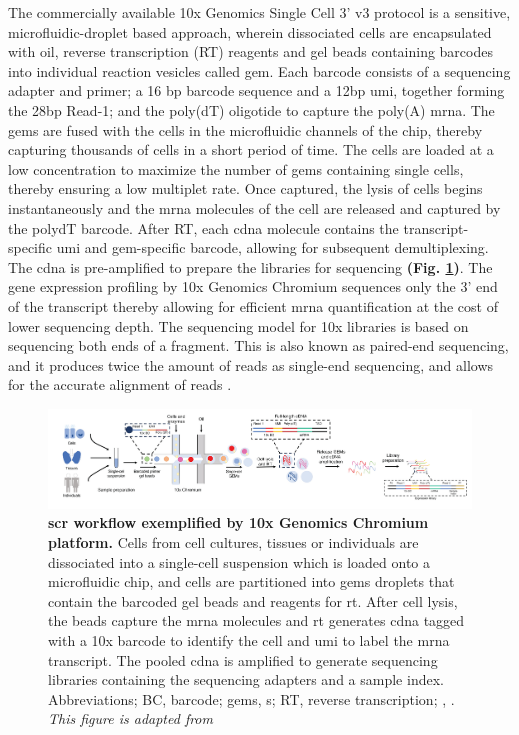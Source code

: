 \par The commercially available 10x Genomics Single Cell 3’ v3 protocol is a sensitive, microfluidic-droplet based approach, wherein dissociated cells are encapsulated with oil, reverse transcription (RT) reagents and gel beads containing barcodes into individual reaction vesicles called \gls{gem}. Each barcode consists of a sequencing adapter and primer; a 16 \gls{bp}  barcode sequence and a 12\gls{bp} \gls{umi}, together forming the 28\gls{bp} Read-1; and the poly(dT) oligotide to capture the poly(A) \gls{mrna}. The \gls{gem}s are fused with the cells in the microfluidic channels of the chip, thereby capturing thousands of cells in a short period of time. The cells are loaded at a low concentration to maximize the number of \gls{gem}s containing single cells, thereby ensuring a low multiplet rate. Once captured, the lysis of cells begins instantaneously and the \gls{mrna} molecules of the cell are released and captured by the polydT barcode. After RT, each \gls{cdna} molecule contains the transcript-specific \gls{umi} and \gls{gem}-specific barcode, allowing for subsequent demultiplexing. The \gls{cdna} is pre-amplified to prepare the libraries for sequencing \textbf{(Fig. \ref{fig:chp1_10xgenomics})}. The gene expression profiling by 10x Genomics Chromium sequences only the 3’ end of the transcript thereby allowing for efficient \gls{mrna} quantification at the cost of lower sequencing depth. The sequencing model for 10x libraries is based on sequencing both ends of a fragment. This is also known as paired-end sequencing, and it produces twice the amount of reads as single-end sequencing, and allows for the accurate alignment of reads \textbf{\cite{danielski_guidance_2023, noauthor_paired-end_nodate}}.\\

\begin{figure}[t]
    \centering
    \includegraphics[width=\linewidth]{Chapter1/Fig/F1-5-03.png}
    \caption[ with 10x Genomics Chromium platform]{\textbf{\gls{scr} workflow exemplified by 10x Genomics Chromium platform.} Cells from cell cultures, tissues or individuals are dissociated into a single-cell suspension which is loaded onto a microfluidic chip, and cells are partitioned into \glspl{gem} droplets that contain the barcoded gel beads and reagents for \gls{rt}. After cell lysis, the beads capture the \gls{mrna} molecules and \gls{rt} generates \gls{cdna} tagged with a 10x barcode to identify the cell and \gls{umi} to label the \gls{mrna} transcript. The pooled \gls{cdna} is amplified to generate sequencing libraries containing the sequencing adapters and a sample index. Abbreviations; BC, barcode; \glspl{gem}, s; RT, reverse transcription; , . \textit{This figure is adapted from \textbf{\cite{swaminath_use_2024}}}}
    \label{fig:chp1_10xgenomics}
\end{figure}


